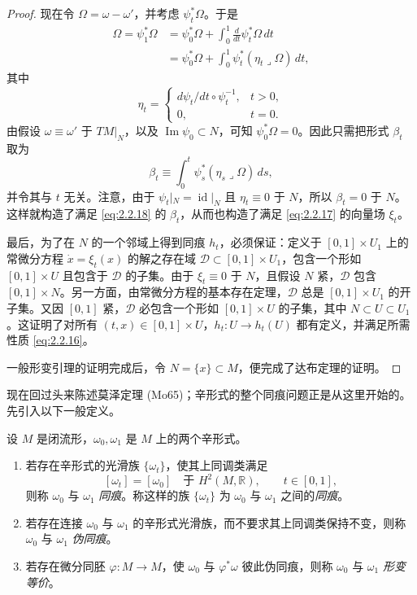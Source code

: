 \begin{proof}
现在令 $\Omega=\omega-\omega'$，并考虑 $\psi_t^*\Omega$。于是
\[
\begin{aligned}
 \Omega=\psi_1^*\Omega
 &=\psi_0^*\Omega+\int_0^1\frac d{dt}\psi_t^*\Omega\,dt\\
 &=\psi_0^*\Omega+\int_0^1\psi_t^*(\eta_t\mathbin{\lrcorner}\Omega)\,dt,
\end{aligned}
\]
其中
\[
 \eta_t=
 \begin{cases}
  d\psi_t/dt\circ\psi_t^{-1},&t>0,\\
  0,&t=0.
 \end{cases}
\]
由假设 $\omega\equiv\omega'$ 于 $TM|_N$，以及 $\operatorname{Im}\psi_0\subset N$，可知 $\psi_0^*\Omega=0$。因此只需把形式 $\beta_t$ 取为
\[
  \beta_t\equiv\int_0^t\psi_s^*(\eta_s\mathbin{\lrcorner}\Omega)\,ds,
\]
并令其与 $t$ 无关。注意，由于 $\psi_t|_N=\operatorname{id}|_N$ 且 $\eta_t\equiv0$ 于 $N$，所以 $\beta_t=0$ 于 $N$。这样就构造了满足 \eqref{eq:2.2.18} 的 $\beta_t$，从而也构造了满足 \eqref{eq:2.2.17} 的向量场 $\xi_t$。

最后，为了在 $N$ 的一个邻域上得到同痕 $h_t$，必须保证：定义于 $[0,1]\times U_1$ 上的常微分方程 $\dot x=\xi_t(x)$ 的解之存在域
$\mathcal D\subset[0,1]\times U_1$，包含一个形如 $[0,1]\times U$ 且包含于 $\mathcal D$ 的子集。由于 $\xi_t\equiv0$ 于 $N$，且假设 $N$ 紧，$\mathcal D$ 包含 $[0,1]\times N$。另一方面，由常微分方程的基本存在定理，$\mathcal D$ 总是 $[0,1]\times U_1$ 的开子集。又因 $[0,1]$ 紧，$\mathcal D$ 必包含一个形如 $[0,1]\times U$ 的子集，其中 $N\subset U\subset U_1$。这证明了对所有 $(t,x)\in[0,1]\times U$，$h_t:U\to h_t(U)$ 都有定义，并满足所需性质 \eqref{eq:2.2.16}。

一般形变引理的证明完成后，令 $N=\{x\}\subset M$，便完成了达布定理的证明。
\end{proof}

现在回过头来陈述莫泽定理 (Mo65)；辛形式的整个同痕问题正是从这里开始的。先引入以下一般定义。

\begin{definition}
\label{def:isotopic-symplectic-forms}
设 $M$ 是闭流形，$\omega_0,\omega_1$ 是 $M$ 上的两个辛形式。
\begin{enumerate}[label=(\arabic*)]
  \item 若存在辛形式的光滑族 $\{\omega_t\}$，使其上同调类满足
  \[
    [\omega_t]=[\omega_0]\quad\text{于 }H^2(M,\mathbb R),
    \qquad t\in[0,1],
  \]
  则称 $\omega_0$ 与 $\omega_1$ \emph{同痕}。称这样的族 $\{\omega_t\}$ 为 $\omega_0$ 与 $\omega_1$ 之间的\emph{同痕}。
  \item 若存在连接 $\omega_0$ 与 $\omega_1$ 的辛形式光滑族，而不要求其上同调类保持不变，则称 $\omega_0$ 与 $\omega_1$ \emph{伪同痕}。
  \item 若存在微分同胚 $\varphi:M\to M$，使 $\omega_0$ 与 $\varphi^*\omega$ 彼此伪同痕，则称 $\omega_0$ 与 $\omega_1$ \emph{形变等价}。
\end{enumerate}
\end{definition}

